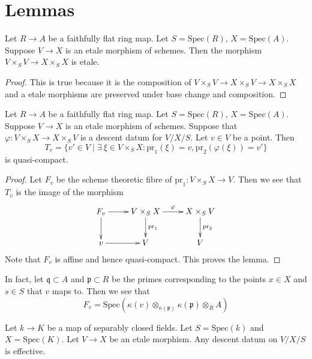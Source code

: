 \section{Lemmas}
\label{section-lemmas}

\begin{lemma}
\label{lemma-etale-gives-etale}
Let $R \to A$ be a faithfully flat ring map.
Let $S = \text{Spec}(R)$, $X = \text{Spec}(A)$.
Suppose $V \to X$ is an etale morphism of schemes.
Then the morphism $V \times_S V \to X \times_S X$ is etale.
\end{lemma}

\begin{proof}
This is true because it is the composition of
$V \times_S V \to X \times_S V \to X \times_S X$ and
a etale morphisms are preserved under base change and
composition.
\end{proof}


\begin{lemma}
Let $R \to A$ be a faithfully flat ring map.
Let $S = \text{Spec}(R)$, $X = \text{Spec}(A)$.
Suppose $V \to X$ is an etale morphism of schemes.
Suppose that $\varphi : V \times_S X \to X \times_S V$
is a descent datum for $V/X/S$. Let $v \in V$ be a point.
Then
$$
T_v = \{v' \in V \mid \exists\ \xi \in V \times_S X:
\text{pr}_1(\xi) = v, \text{pr}_2(\varphi(\xi)) = v'\}
$$
is quasi-compact.
\end{lemma}

\begin{proof}
Let $F_v$ be the scheme theoretic fibre of $\text{pr}_1 : V \times_S X \to V$.
Then we see that $T_v$ is the image of the morphism
$$
\xymatrix{
F_v \ar[r] \ar[d] &
V \times_S X \ar[r]^{\varphi} \ar[d]^{\text{pr}_1} &
X \times_S V  \ar[d]^{\text{pr}_2} \\
v \ar[r] &
V &
V
}
$$
Note that $F_v$ is affine and hence quasi-compact. This proves
the lemma.
\end{proof}

\noindent
In fact, let $\mathfrak q \subset A$ and $\mathfrak p \subset R$
be the primes corresponding to the points $x \in X$ and $s \in S$
that $v$ maps to. Then we see that
$$
F_v = \text{Spec}(
\kappa(v) \otimes_{\kappa(\mathfrak p)}
\kappa(\mathfrak p) \otimes_R A
)
$$


\begin{lemma}
\label{lemma-descent-etale-map-separably-closed-fields}
Let $k \to K$ be a map of separably closed fields.
Let $S = \text{Spec}(k)$ and $X = \text{Spec}(K)$.
Let $V \to X$ be an etale morphism. Any descent datum
on $V/X/S$ is effective.
\end{lemma}

